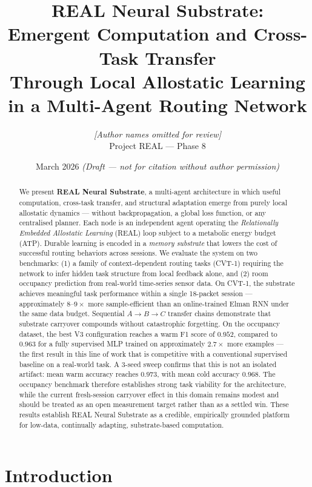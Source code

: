 \documentclass[10pt,twocolumn]{article}
\title{%
  \textbf{REAL Neural Substrate:}\\
  Emergent Computation and Cross-Task Transfer\\
  Through Local Allostatic Learning\\
  in a Multi-Agent Routing Network
}
\author{%
  \textit{[Author names omitted for review]}\\
  \small Project REAL --- Phase 8
}
\date{March 2026 \quad \textit{(Draft --- not for citation without author permission)}}
\begin{document}
\maketitle

\begin{abstract}
We present \textbf{REAL Neural Substrate}, a multi-agent architecture in which
useful computation, cross-task transfer, and structural adaptation emerge from
purely local allostatic dynamics --- without backpropagation, a global loss
function, or any centralised planner.
Each node is an independent agent operating the \emph{Relationally Embedded Allostatic Learning}
(REAL) loop subject to a metabolic energy budget (ATP).
Durable learning is encoded in a \emph{memory substrate} that lowers the cost of
successful routing behaviors across sessions.
We evaluate the system on two benchmarks: (1) a family of context-dependent
routing tasks (CVT-1) requiring the network to infer hidden task structure from
local feedback alone, and (2) room occupancy prediction from real-world
time-series sensor data.
On CVT-1, the substrate achieves meaningful task performance within a single
18-packet session --- approximately $8$--$9\times$ more sample-efficient than an
online-trained Elman RNN under the same data budget.
Sequential $A \to B \to C$ transfer chains demonstrate that substrate carryover
compounds without catastrophic forgetting.
On the occupancy dataset, the best V3 configuration reaches a warm F1 score
of $\mathbf{0.952}$, compared to $0.963$ for a fully supervised MLP trained on
approximately $2.7\times$ more examples --- the first result in this line of
work that is competitive with a conventional supervised baseline on a
real-world task.
A 3-seed sweep confirms that this is not an isolated artifact: mean warm
accuracy reaches $0.973$, with mean cold accuracy $0.968$.
The occupancy benchmark therefore establishes strong task viability for the
architecture, while the current fresh-session carryover effect in this domain
remains modest and should be treated as an open measurement target rather than
as a settled win.
These results establish REAL Neural Substrate as a credible, empirically
grounded platform for low-data, continually adapting, substrate-based
computation.
\end{abstract}

\section{Introduction}
\label{sec:intro}
\end{document}
